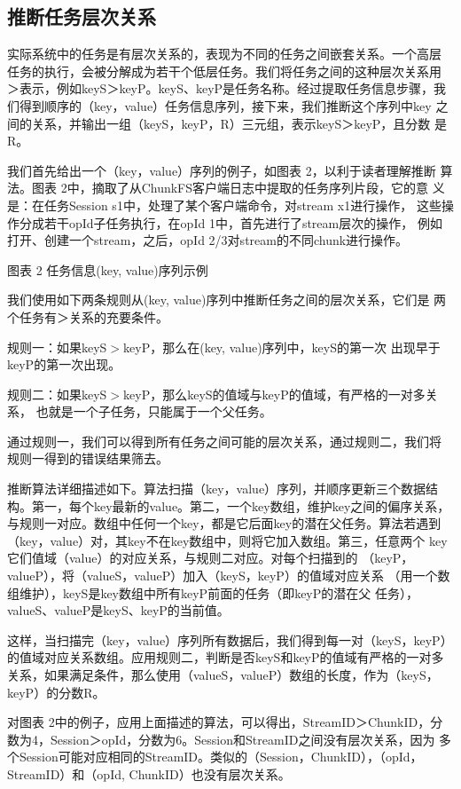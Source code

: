 \subsection{推断任务层次关系}

实际系统中的任务是有层次关系的，表现为不同的任务之间嵌套关系。一个高层
任务的执行，会被分解成为若干个低层任务。我们将任务之间的这种层次关系用
＞表示，例如keyS＞keyP。keyS、keyP是任务名称。经过提取任务信息步骤，我
们得到顺序的（key，value）任务信息序列，接下来，我们推断这个序列中key
之间的关系，并输出一组（keyS，keyP，R）三元组，表示keyS＞keyP，且分数
是R。

我们首先给出一个（key，value）序列的例子，如图表 2，以利于读者理解推断
算法。图表 2中，摘取了从ChunkFS客户端日志中提取的任务序列片段，它的意
义是：在任务Session s1中，处理了某个客户端命令，对stream x1进行操作，
这些操作分成若干opId子任务执行，在opId 1中，首先进行了stream层次的操作，
例如打开、创建一个stream，之后，opId 2/3对stream的不同chunk进行操作。
 
图表 2 任务信息(key, value)序列示例

我们使用如下两条规则从(key, value)序列中推断任务之间的层次关系，它们是
两个任务有＞关系的充要条件。

规则一：如果keyS$>$keyP，那么在(key, value)序列中，keyS的第一次
出现早于keyP的第一次出现。

规则二：如果keyS$>$keyP，那么keyS的值域与keyP的值域，有严格的一对多关系，
也就是一个子任务，只能属于一个父任务。

通过规则一，我们可以得到所有任务之间可能的层次关系，通过规则二，我们将
规则一得到的错误结果筛去。

推断算法详细描述如下。算法扫描（key，value）序列，并顺序更新三个数据结
构。第一，每个key最新的value。第二，一个key数组，维护key之间的偏序关系，
与规则一对应。数组中任何一个key，都是它后面key的潜在父任务。算法若遇到
（key，value）对，其key不在key数组中，则将它加入数组。第三，任意两个
key它们值域（value）的对应关系，与规则二对应。对每个扫描到的
（keyP，valueP），将（valueS，valueP）加入（keyS，keyP）的值域对应关系
（用一个数组维护），keyS是key数组中所有keyP前面的任务（即keyP的潜在父
任务），valueS、valueP是keyS、keyP的当前值。

这样，当扫描完（key，value）序列所有数据后，我们得到每一对（keyS，keyP）
的值域对应关系数组。应用规则二，判断是否keyS和keyP的值域有严格的一对多
关系，如果满足条件，那么使用（valueS，valueP）数组的长度，作为（keyS，
keyP）的分数R。

对图表 2中的例子，应用上面描述的算法，可以得出，StreamID＞ChunkID，分
数为4，Session＞opId，分数为6。Session和StreamID之间没有层次关系，因为
多个Session可能对应相同的StreamID。类似的（Session，ChunkID），（opId，
StreamID）和（opId, ChunkID）也没有层次关系。

